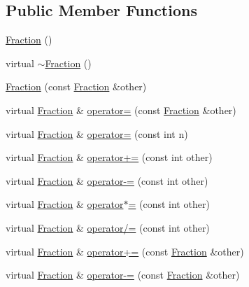 \subsection*{Public Member Functions}
\begin{DoxyCompactItemize}
\item 
\hyperlink{class_alg_lib_1_1_fraction_a4f4d5c1e3e177705af049ae1fc4ffb09}{Fraction} ()
\item 
virtual \hyperlink{class_alg_lib_1_1_fraction_aed844397d914c8b54fc5f8dd1893ea63}{$\sim$\+Fraction} ()
\item 
\hyperlink{class_alg_lib_1_1_fraction_a7d979fdca2756edb38e2f6e02c456945}{Fraction} (const \hyperlink{class_alg_lib_1_1_fraction}{Fraction} \&other)
\item 
virtual \hyperlink{class_alg_lib_1_1_fraction}{Fraction} \& \hyperlink{class_alg_lib_1_1_fraction_a93407b0ce7ebfd38f07a25e476243e46}{operator=} (const \hyperlink{class_alg_lib_1_1_fraction}{Fraction} \&other)
\item 
virtual \hyperlink{class_alg_lib_1_1_fraction}{Fraction} \& \hyperlink{class_alg_lib_1_1_fraction_a77f3cf204458ae50677be0a3d2fca383}{operator=} (const int n)
\item 
virtual \hyperlink{class_alg_lib_1_1_fraction}{Fraction} \& \hyperlink{class_alg_lib_1_1_fraction_afd8e8608c4789bfe09f957e377010275}{operator+=} (const int other)
\item 
virtual \hyperlink{class_alg_lib_1_1_fraction}{Fraction} \& \hyperlink{class_alg_lib_1_1_fraction_aa54117f58580597ec4159769c25745b0}{operator-\/=} (const int other)
\item 
virtual \hyperlink{class_alg_lib_1_1_fraction}{Fraction} \& \hyperlink{class_alg_lib_1_1_fraction_a2fcea0923ebd05d7e5fcbba499734da3}{operator$\ast$=} (const int other)
\item 
virtual \hyperlink{class_alg_lib_1_1_fraction}{Fraction} \& \hyperlink{class_alg_lib_1_1_fraction_ad844a41ab7d8a4155e8a563d70fca706}{operator/=} (const int other)
\item 
virtual \hyperlink{class_alg_lib_1_1_fraction}{Fraction} \& \hyperlink{class_alg_lib_1_1_fraction_ae91d89df1b4a0992fa23316a1736131a}{operator+=} (const \hyperlink{class_alg_lib_1_1_fraction}{Fraction} \&other)
\item 
virtual \hyperlink{class_alg_lib_1_1_fraction}{Fraction} \& \hyperlink{class_alg_lib_1_1_fraction_a5e99fb29b42a5e4c7f042b20c89787f4}{operator-\/=} (const \hyperlink{class_alg_lib_1_1_fraction}{Fraction} \&other)
\item 

\end{DoxyCompactItemize}
